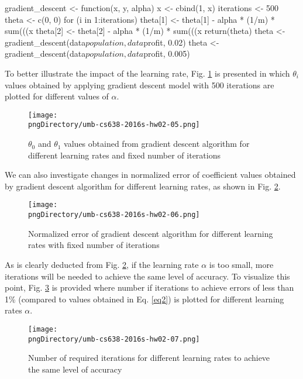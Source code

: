 \documentclass[12pt,letterpaper,twoside]{article}
\begin{document}
\begin{terminal}
gradient_descent <- function(x, y, alpha) {
	x <- cbind(1, x)
	iterations <- 500
	theta <- c(0, 0)
	for (i in 1:iterations)
	{
		theta[1] <- theta[1] - alpha * (1/m) * sum(((x%
		theta[2] <- theta[2] - alpha * (1/m) * sum(((x%
	}
	return(theta)
}
theta <- gradient_descent(data$population, data$profit, 0.02)
theta <- gradient_descent(data$population, data$profit, 0.005)
\end{terminal}

To better illustrate the impact of the learning rate, Fig. \ref{fig3} is presented in which $\theta_i$ values obtained by applying gradient descent model with 500 iterations are plotted for different values of $\alpha$.

\begin{figure}\centering
\texttt{[image: \\pngDirectory/umb-cs638-2016s-hw02-05.png]}
\caption{$\theta_0$ and $\theta_1$ values obtained from gradient descent algorithm for different learning rates and fixed number of iterations}\label{fig3}
\end{figure}

We can also investigate changes in normalized error of coefficient values obtained by gradient descent algorithm for different learning rates, as shown in Fig. \ref{fig4}.

\begin{figure}\centering
\texttt{[image: \\pngDirectory/umb-cs638-2016s-hw02-06.png]}
\caption{Normalized error of gradient descent algorithm for different learning rates with fixed number of iterations}\label{fig4}
\end{figure}

As is clearly deducted from Fig. \ref{fig4}, if the learning rate $\alpha$ is too small, more iterations will be needed to achieve the same level of accuracy.
To visualize this point, Fig. \ref{fig5} is provided where number if iterations to achieve errors of less than 1\% (compared to values obtained in Eq. \ref{eq2}) is plotted for different learning rates $\alpha$.

\begin{figure}\centering
\texttt{[image: \\pngDirectory/umb-cs638-2016s-hw02-07.png]}
\caption{Number of required iterations for different learning rates to achieve the same level of accuracy}\label{fig5}
\end{figure}

\newpage
\end{document}
